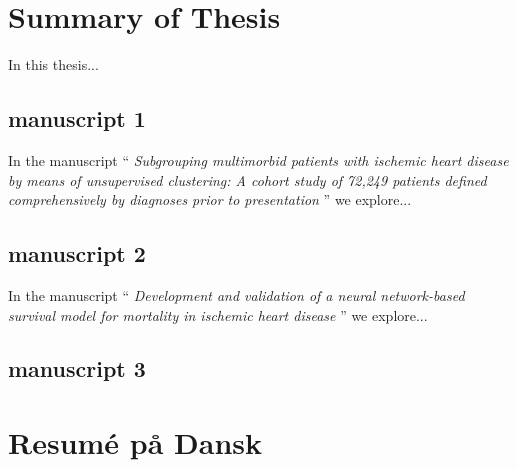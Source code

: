 \chapter{Summary of Thesis}


In this thesis...

\section{manuscript 1}

In the manuscript \enquote{\textit{%
    Subgrouping multimorbid patients with ischemic heart disease by means 
    of unsupervised clustering: A cohort study of 72,249 patients
    defined comprehensively by diagnoses prior to presentation
}} we explore...

\section{manuscript 2}

In the manuscript \enquote{\textit{%
    Development and validation of a neural network-based survival model for
    mortality in ischemic heart disease
}} we explore...

\section{manuscript 3}

\chapter*{Resumé på Dansk}
